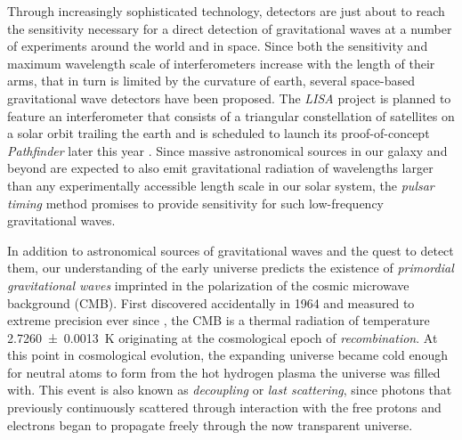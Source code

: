 \documentclass[12pt,parskip=half]{scrreprt}
\begin{document}
Through increasingly sophisticated technology, detectors are just about to reach the sensitivity necessary for a direct detection of gravitational waves at a number of experiments around the world and in space. Since both the sensitivity and maximum wavelength scale of interferometers increase with the length of their arms, that in turn is limited by the curvature of earth, several space-based gravitational wave detectors have been proposed. The \emph{LISA} project is planned to feature an interferometer that consists of a triangular constellation of satellites on a solar orbit trailing the earth and is scheduled to launch its proof-of-concept \emph{Pathfinder} later this year \autocite{LISA2014}. Since massive astronomical sources in our galaxy and beyond are expected to also emit gravitational radiation of wavelengths larger than any experimentally accessible length scale in our solar system, the \emph{pulsar timing} method \autocite[and references therein]{IPTA2009} promises to provide sensitivity for such low-frequency gravitational waves.

In addition to astronomical sources of gravitational waves and the quest to detect them, our understanding of the early universe predicts the existence of \emph{primordial gravitational waves} imprinted in the polarization of the cosmic microwave background (CMB). First discovered accidentally in 1964 \autocite{Penzias1965} and measured to extreme precision ever since \autocite{Planck2015}, the CMB is a thermal radiation of temperature \SI{2.7260+-0.0013}{\kelvin} \autocite{Fixsen2009} originating at the cosmological epoch of \emph{recombination}. At this point in cosmological evolution, the expanding universe became cold enough for neutral atoms to form from the hot hydrogen plasma the universe was filled with. This event is also known as \emph{decoupling} or \emph{last scattering}, since photons that previously continuously scattered through interaction with the free protons and electrons began to propagate freely through the now transparent universe.
\end{document}
